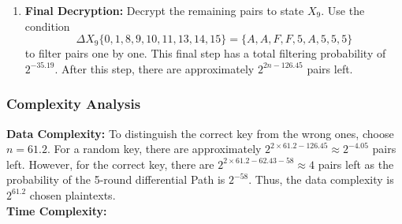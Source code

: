 \documentclass{article}
\begin{document}
\begin{enumerate}
    \item \textbf{Final Decryption:}  
    Decrypt the remaining pairs to state $X_9$. Use the condition  
    \[
    \Delta X_9\{0, 1, 8, 9, 10, 11, 13, 14, 15\} = \{A, A, F, F, 5, A, 5, 5, 5\}
    \]  
    to filter pairs one by one. This final step has a total filtering probability of $2^{-35.19}$. After this step, there are approximately $2^{2n-126.45}$ pairs left.
\end{enumerate}


\subsubsection{Complexity Analysis}

\textbf{Data Complexity:}  
To distinguish the correct key from the wrong ones, choose $n = 61.2$. For a random key, there are approximately $2^{2 \times 61.2 - 126.45} \approx 2^{-4.05}$ pairs left. However, for the correct key, there are $2^{2 \times 61.2 - 62.43 - 58} \approx 4$ pairs left as the probability of the 5-round differential Path is $2^{-58}$. Thus, the data complexity is $2^{61.2}$ chosen plaintexts.\\
\newline
\textbf{Time Complexity:}  
\end{document}
